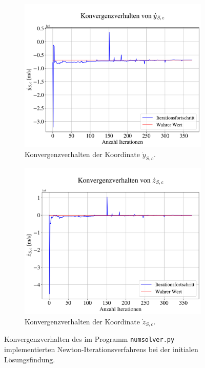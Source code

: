 \documentclass[a4paper,12pt]{article}
\numberwithin{equation}{section}
\begin{document}
\begin{figure}[ht]\ContinuedFloat
	\begin{subfigure}[t]{0.49\textwidth}
	\centering
	\includegraphics[width=\textwidth]{figures/conv_yv.png}
	\caption{Konvergenzverhalten der Koordinate $\dot{y}_{S,c}$.}
	\label{fig:konvverh5yv}
	\end{subfigure}
	\hfill
	\begin{subfigure}[t]{0.49\textwidth}
	\centering
	\includegraphics[width=\textwidth]{figures/conv_zv.png}
	\caption{Konvergenzverhalten der Koordinate $\dot{z}_{S,c}$.}
	\label{fig:konvverh6zv}
	\end{subfigure}
\cprotect\caption{Konvergenzverhalten des im Programm \verb|numsolver.py| implementierten Newton-Iterationsverfahrens bei der initialen Lösungsfindung.}
\end{figure}
\FloatBarrier
\end{document}

